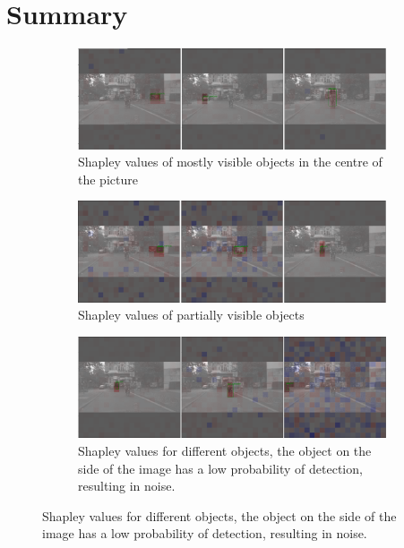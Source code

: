 \section{Summary}\label{sec:results}
\begin{figure}[h!]
    \centering
    \begin{subfigure}[b]{\textwidth}
        \includegraphics[width=\textwidth]{figures/output}
        \caption{Shapley values of mostly visible objects in the centre of the picture}\label{fig:SHAP_results2}
    \end{subfigure}
    \hfill
    \begin{subfigure}[b]{\textwidth}
        \includegraphics[width=\textwidth]{figures/output2}
        \caption{Shapley values of partially visible objects}\label{fig:SHAP_results20}
    \end{subfigure}
    \hfill
    \begin{subfigure}[b]{\textwidth}
        \includegraphics[width=\textwidth]{figures/output2,1}
        \caption{Shapley values for different objects, the object on the side of the image has a low probability of detection, resulting in noise.}\label{fig:SHAP_results21}
    \end{subfigure}

\end{figure}
